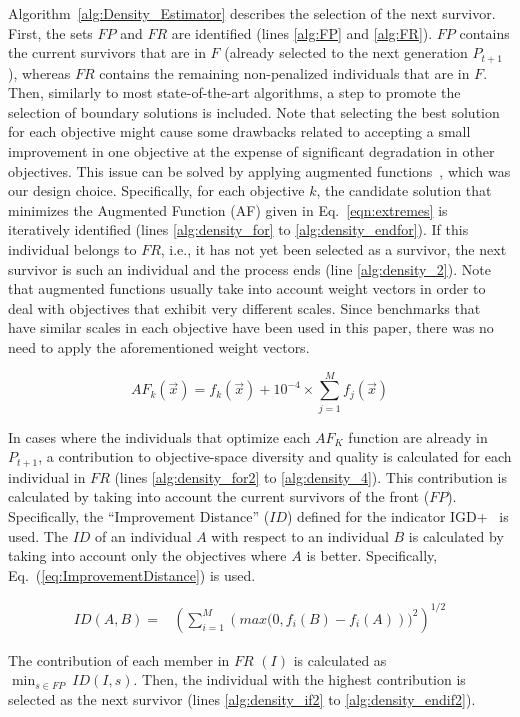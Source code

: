 Algorithm~\ref{alg:Density_Estimator} describes the selection of the next survivor.
%
First, the sets $FP$ and $FR$ are identified (lines \ref{alg:FP} and \ref{alg:FR}).
%
$FP$ contains the current survivors that are in $F$ (already selected to the next generation $P_{t+1}$), whereas $FR$ contains
the remaining non-penalized individuals that are in $F$.
%
Then, similarly to most state-of-the-art algorithms, a step to promote the selection of boundary solutions
is included.
%
Note that selecting the best solution for each objective might cause some drawbacks related to accepting a small improvement
in one objective at the expense of significant degradation in other objectives.
%
This issue can be solved by applying augmented functions~\citep{deb2016optimality}, which was our design choice.
%
Specifically, for each objective $k$, the candidate solution that minimizes the Augmented Function (AF)
given in Eq.~\ref{eqn:extremes} is iteratively identified (lines \ref{alg:density_for} to \ref{alg:density_endfor}).
%
If this individual belongs to $FR$, i.e., it has not yet been selected as a survivor, the next survivor is such an individual
and the process ends (line \ref{alg:density_2}).
%
Note that augmented functions usually take into account weight vectors in order to deal with objectives
that exhibit very different scales.
%
Since benchmarks that have similar scales in each objective have been used in this paper, there was no need to apply
the aforementioned weight vectors.

\begin{equation}\label{eqn:extremes}
AF_k (\vec{x}) = f_k(\vec{x}) + 10^{-4} \times  \sum_{j=1}^M f_j( \vec{x} )
\end{equation}

In cases where the individuals that optimize each $AF_K$ function are already in $P_{t+1}$, a contribution
to objective-space diversity and quality is calculated for each individual in $FR$ (lines \ref{alg:density_for2} to \ref{alg:density_4}).
%
This contribution is calculated by taking into account the current survivors of the front ($FP$).
%
Specifically, the ``Improvement Distance'' ($ID$) defined for the indicator IGD+~\citep{Joel:Inverted_Generational_Distance_Plus}
is used.
%
The $ID$ of an individual $A$ with respect to an individual $B$ is calculated by taking into account only the objectives
where $A$ is better.
%
Specifically, Eq.~(\ref{eq:ImprovementDistance}) is used.

\begin{equation} \label{eq:ImprovementDistance}
\begin{split}
 ID(A, B) = &  \left (\sum_{i=1}^M \left (max(0, f_i(B) - f_i(A) \right ))^2  \right)^{1/2}
\end{split}
\end{equation}

The contribution of each member in $FR$ $(I)$ is calculated as $\displaystyle{\min_{s \in FP}\ ID(I, s)}$.
%
Then, the individual with the highest contribution is selected as the next survivor (lines \ref{alg:density_if2} 
to \ref{alg:density_endif2}).

